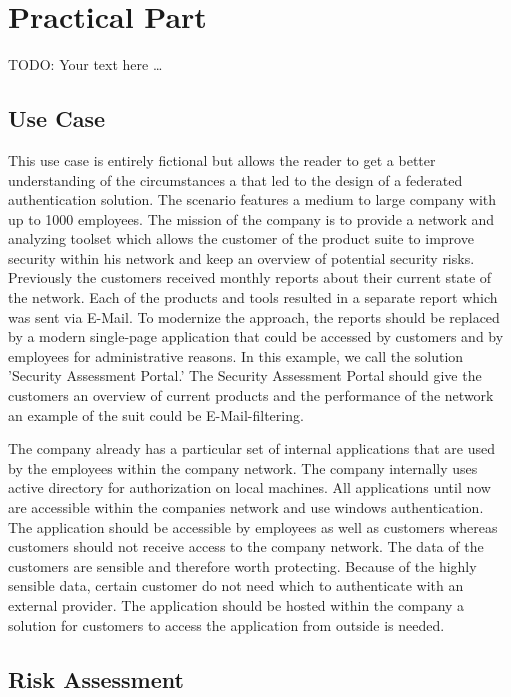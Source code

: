 \chapter{Practical Part}\label{chap:practicalPart}
\chapterstart

TODO: Your text here \ldots
\section{Use Case}
This use case is entirely fictional but allows the reader to get a better understanding of the circumstances a that led to the design of a federated authentication solution. The scenario features a medium to large company with up to 1000 employees. The mission of the company is to provide a network and analyzing toolset which allows the customer of the product suite to improve security within his network and keep an overview of potential security risks. Previously the customers received monthly reports about their current state of the network. Each of the products and tools resulted in a separate report which was sent via E-Mail. To modernize the approach, the reports should be replaced by a modern single-page application that could be accessed by customers and by employees for administrative reasons. In this example, we call the solution 'Security Assessment Portal.' The Security Assessment Portal should give the customers an overview of current products and the performance of the network an example of the suit could be E-Mail-filtering.  

The company already has a particular set of internal applications that are used by the employees within the company network. The company internally uses active directory for authorization on local machines. All applications until now are accessible within the companies network and use windows authentication. The application should be accessible by employees as well as customers whereas customers should not receive access to the company network. The data of the customers are sensible and therefore worth protecting. Because of the highly sensible data, certain customer do not need which to authenticate with an external provider. The application should be hosted within the company a solution for customers to access the application from outside is needed.


\section{Risk Assessment}

